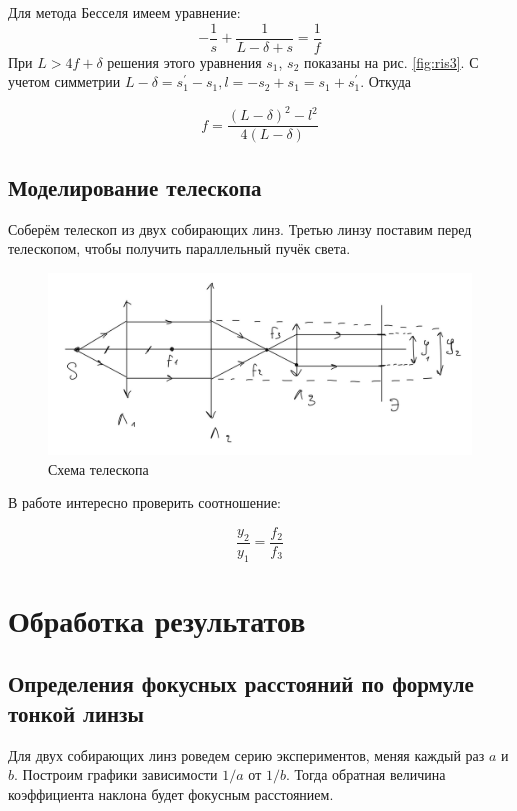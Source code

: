 \documentclass[a4paper, 12pt]{article}
\begin{document}
Для метода Бесселя имеем уравнение:
\begin{equation}
	-\frac{1}{s} + \frac{1}{L - \delta + s} = \frac{1}{f}
\end{equation}
При $L > 4f + \delta $ решения этого уравнения $s_1$, $s_2$ показаны на рис. {\ref{fig:ris3}}. С учетом симметрии $L - \delta = s^{'}_1 - s_1, l = -s_2 + s_1 = s_1 + s^{'}_1$. Откуда

\begin{equation}
	f = \frac{(L - \delta)^2 - l^2}{4(L - \delta)}
\end{equation}

\subsection{Моделирование телескопа}

Соберём телескоп из двух собирающих линз. Третью линзу поставим перед телескопом, чтобы получить параллельный пучёк света. 

\begin{figure}[H]
    \centering
    \includegraphics[width=1\textwidth]{telescope.jpg}
    \caption{Схема телескопа}
    \label{fig:ris2}
\end{figure}

В работе интересно проверить соотношение:

\begin{equation}
	\frac{y_2}{y_1} = \frac{f_2}{f_3}
\end{equation}

\section{Обработка результатов}

\subsection{Определения фокусных расстояний по формуле тонкой линзы}
Для двух собирающих линз роведем серию экспериментов, меняя каждый раз $a$ и $b$. Построим графики зависимости $1/a$ от $1/b$. Тогда обратная величина коэффициента наклона будет фокусным расстоянием.
\end{document}
